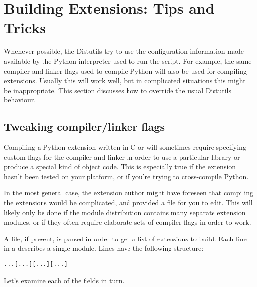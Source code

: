 \documentclass{howto}
\begin{document}
\section{Building Extensions: Tips and Tricks}
\label{building-ext}

Whenever possible, the Distutils try to use the configuration
information made available by the Python interpreter used to run the
 script.  For example, the same compiler and linker
flags used to compile Python will also be used for compiling
extensions.  Usually this will work well, but in complicated
situations this might be inappropriate.  This section discusses how to
override the usual Distutils behaviour.

\subsection{Tweaking compiler/linker flags}
\label{tweak-flags}

Compiling a Python extension written in C or \Cpp will sometimes
require specifying custom flags for the compiler and linker in order
to use a particular library or produce a special kind of object code.
This is especially true if the extension hasn't been tested on your 
platform, or if you're trying to cross-compile Python.

In the most general case, the extension author might have foreseen
that compiling the extensions would be complicated, and provided a
 file for you to edit.  This will likely only be done if
the module distribution contains many separate extension modules, or
if they often require elaborate sets of compiler flags in order to work.

A  file, if present, is parsed in order to get a list of
extensions to build.  Each line in a  describes a single
module.  Lines have the following structure:

\begin{alltt}
 ... [ ...] [ ...] [ ...]
\end{alltt}

Let's examine each of the fields in turn.
\end{document}
